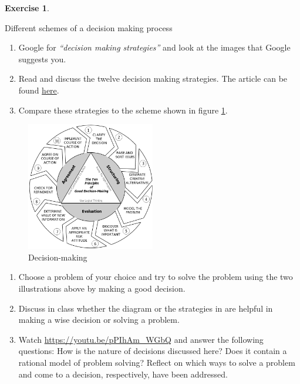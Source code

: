 \documentclass[
  12pt,
  oneside]{book}
\theoremstyle{definition}
\theoremstyle{definition}
\theoremstyle{definition}
\newtheorem{exercise}{Exercise}[chapter]
\theoremstyle{definition}
\theoremstyle{remark}
\begin{document}
\begin{exercise}
\protect\hypertarget{exr:decisionstrategy}{}\label{exr:decisionstrategy}

Different schemes of a decision making process

\begin{enumerate}
\def\labelenumi{\alph{enumi})}
\item
  Google for \emph{``decision making strategies''} and look at the images that Google suggests you.
\item
  Read \citet{IET202312} and discuss the twelve decision making strategies. The article can be found \href{https://www.indeed.com/career-advice/career-development/decision-making-strategies?utm_campaign=earnedsocial\%3Acareerguide\%3Asharedirectshare\%3AUS&utm_content=12\%20Decision-Making\%20Strategies&utm_medium=social&utm_source=directshare}{here}.
\item
  Compare these strategies to the scheme shown in figure \ref{fig:decision}.
\end{enumerate}

\begin{figure}
\centering
\includegraphics[width=0.5\textwidth,height=\textheight]{fig/tenprincipals_png.png}
\caption[\label{fig:decision} Decision-making]{\label{fig:decision} Decision-making\footnotemark{}}
\end{figure}

\begin{enumerate}
\def\labelenumi{\alph{enumi})}
\setcounter{enumi}{3}
\item
  Choose a problem of your choice and try to solve the problem using the two illustrations above by making a good decision.
\item
  Discuss in class whether the diagram or the strategies in \citet{IET202312} are helpful in making a wise decision or solving a problem.
\item
  Watch \url{https://youtu.be/pPIhAm_WGbQ} and answer the following questions: How is the nature of decisions discussed here? Does it contain a rational model of problem solving? Reflect on which ways to solve a problem and come to a decision, respectively, have been addressed.
\end{enumerate}

\end{exercise}
\end{document}
